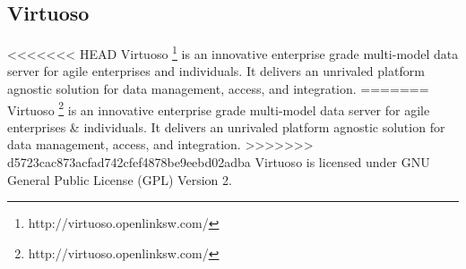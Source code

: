 \subsection{Virtuoso}
\label{sec:Sesame}
<<<<<<< HEAD
Virtuoso \footnote{http://virtuoso.openlinksw.com/} is an innovative enterprise grade multi-model data server for agile enterprises and individuals.
It delivers an unrivaled  platform agnostic solution for data management, access, and integration.
=======
Virtuoso \footnote{http://virtuoso.openlinksw.com/} is an innovative enterprise grade multi-model data server for agile enterprises
\& individuals. It delivers an unrivaled platform agnostic solution for data management, access, and integration.
>>>>>>> d5723cac873acfad742cfef4878be9eebd02adba
Virtuoso is licensed under GNU General Public License (GPL) Version 2.
